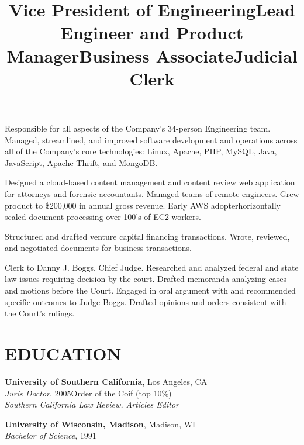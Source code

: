 \documentclass[margin]{res}
\begin{document}
\begin{resume}
\title{\textbf{Vice President of Engineering}}
\begin{position}
\hspace*{.5cm}Responsible for all aspects of the Company's 34-person Engineering team. Managed, streamlined, and improved software development and operations across all of the Company's core technologies: Linux, Apache, PHP, MySQL, Java, JavaScript, Apache Thrift, and MongoDB.
\end{position}

\title{\textbf{Lead Engineer and Product Manager}}
\begin{position}
\hspace*{.5cm}Designed a cloud-based content management and content review web application for attorneys and forensic accountants.  Managed teams of remote engineers. Grew product to \$200,000 in annual gross revenue. Early AWS adopter\textemdash horizontally scaled document processing over 100's of EC2 workers.
\end{position}

\title{\textbf{Business Associate}}
\begin{position}
\hspace*{.5cm}Structured and drafted venture capital financing transactions. Wrote, reviewed, and negotiated documents for business transactions.
\end{position}

\title{\textbf{Judicial Clerk}}
\begin{position}
\hspace*{.5cm}Clerk to Danny J. Boggs, Chief Judge. Researched and analyzed federal and state law issues requiring decision by the court. Drafted memoranda analyzing cases and motions before the Court. Engaged in oral argument with and recommended specific outcomes to Judge Boggs. Drafted opinions and orders consistent with the Court’s rulings.
\end{position}

\section{EDUCATION}

\textbf{University of Southern California}, Los Angeles, CA\\
{\sl Juris Doctor}, 2005\hfill Order of the Coif
(top 10\%)
\\
{\sl Southern California Law Review, Articles Editor}

\textbf{University of Wisconsin, Madison}, Madison, WI\\
{\sl Bachelor of Science}, 1991

\end{resume}
\end{document}
